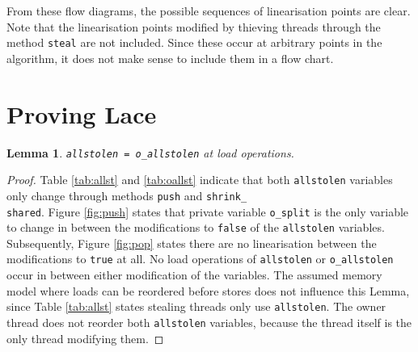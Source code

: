 \documentclass{sig-alternate-br}
\newtheorem{lemma}{Lemma}
\begin{document}
From these flow diagrams, the possible sequences of linearisation points are clear.
Note that the linearisation points modified by thieving threads through the method \texttt{steal} are not included.
Since these occur at arbitrary points in the algorithm, it does not make sense to include them in a flow chart.

\section{Proving Lace}
\begin{lemma}
	\texttt{allstolen = o\_allstolen} at load operations.
	\label{lem:allstolen}
\end{lemma}
\begin{proof}
	Table \ref{tab:allst} and \ref{tab:oallst} indicate that both \texttt{allstolen} variables only change through methods \texttt{push} and \texttt{shrink\_\\shared}.
	Figure \ref{fig:push} states that private variable \texttt{o\_split} is the only variable to change in between the modifications to \texttt{false} of the \texttt{allstolen} variables.
	Subsequently, Figure \ref{fig:pop} states there are no linearisation between the modifications to \texttt{true} at all.
	No load operations of \texttt{allstolen} or \texttt{o\_allstolen} occur in between either modification of the variables.
	The assumed memory model where loads can be reordered before stores does not influence this Lemma, since Table \ref{tab:allst} states stealing threads only use \texttt{allstolen}.
	The owner thread does not reorder both \texttt{allstolen} variables, because the thread itself is the only thread modifying them.
\end{proof}
\end{document}
